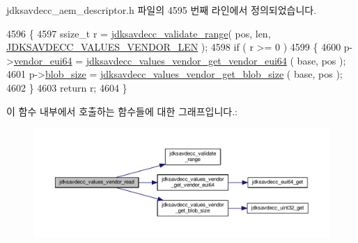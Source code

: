 jdksavdecc\+\_\+aem\+\_\+descriptor.\+h 파일의 4595 번째 라인에서 정의되었습니다.


\begin{DoxyCode}
4596 \{
4597     ssize\_t r = \hyperlink{group__util_ga9c02bdfe76c69163647c3196db7a73a1}{jdksavdecc\_validate\_range}( pos, len, 
      \hyperlink{group__values__vendor_ga9c664c291aa8ec431f7399f836701ca5}{JDKSAVDECC\_VALUES\_VENDOR\_LEN} );
4598     \textcolor{keywordflow}{if} ( r >= 0 )
4599     \{
4600         p->\hyperlink{structjdksavdecc__values__vendor_a6183c85748a8af0003d293d653c4ae9b}{vendor\_eui64} = \hyperlink{group__values__vendor_ga7cbde0c8a9c382e4783b5d4c7059958c}{jdksavdecc\_values\_vendor\_get\_vendor\_eui64}
      ( base, pos );
4601         p->\hyperlink{structjdksavdecc__values__vendor_a32143551b70893faef60f6e35f88ed50}{blob\_size} = \hyperlink{group__values__vendor_ga99e87579e7be48c94965ade13df2cd05}{jdksavdecc\_values\_vendor\_get\_blob\_size}
      ( base, pos );
4602     \}
4603     \textcolor{keywordflow}{return} r;
4604 \}
\end{DoxyCode}


이 함수 내부에서 호출하는 함수들에 대한 그래프입니다.\+:
\nopagebreak
\begin{figure}[H]
\begin{center}
\leavevmode
\includegraphics[width=350pt]{group__values__vendor_ga31f429212ad2e628956cc960e479e0c4_cgraph}
\end{center}
\end{figure}


